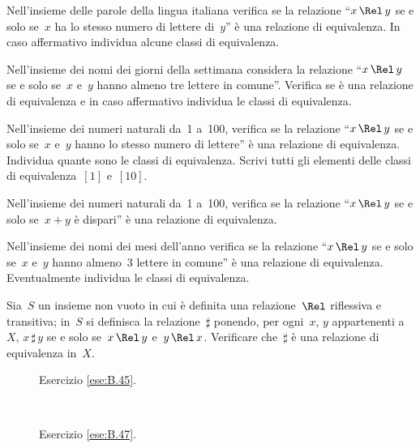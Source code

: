 \begin{multicols}{2}
\begin{esercizio}
\label{ese:B.38}
Nell'insieme delle parole della lingua italiana verifica se la relazione ``$x \,\Rel\, y$ se e solo se~$x$ ha lo stesso numero di lettere di~$y$'' è
una relazione di equivalenza. In caso affermativo individua alcune classi di
equivalenza.
\end{esercizio}

\begin{esercizio}
\label{ese:B.39}
Nell'insieme dei nomi dei giorni della settimana considera la relazione ``$x \,\Rel\, y$ se e solo se~$x$ e~$y$ hanno almeno tre lettere in comune''.
Verifica se è una relazione di equivalenza e in caso affermativo individua le
classi di equivalenza.
\end{esercizio}

\begin{esercizio}
\label{ese:B.40}
Nell'insieme dei numeri naturali da~1 a~100, verifica se la relazione ``$x \,\Rel\, y$ se e solo se~$x$ e~$y$ hanno lo stesso numero di lettere''
è una relazione di equivalenza. Individua quante sono le classi di equivalenza.
Scrivi tutti gli elementi delle classi di equivalenza~$[1]$ e~$[10]$.
\end{esercizio}

\begin{esercizio}
\label{ese:B.41}
Nell'insieme dei numeri naturali da~1 a~100, verifica se la relazione ``$x \,\Rel\, y$ se e solo se~$x+y$ è
dispari'' è una relazione di equivalenza.
\end{esercizio}

\begin{esercizio}
\label{ese:B.42}
Nell'insieme dei nomi dei mesi dell'anno verifica se la relazione ``$x \,\Rel\, y$ se e solo se~$x$ e~$y$ hanno almeno~3 lettere in comune''
è una relazione di equivalenza. Eventualmente individua le classi di equivalenza.
\end{esercizio}

\begin{esercizio}
\label{ese:B.43}
Sia~$S$ un insieme non vuoto in cui è definita una relazione~$\Rel$ riflessiva e transitiva; in~$S$ si definisca la relazione~$\sharp$ ponendo,
per ogni~$x$, $y$ appartenenti a~$X$, $x \,\sharp\, y$ se e solo se~$x \,\Rel\, y$ e~$y \,\Rel\, x$. Verificare che~$\sharp$ è una relazione di equivalenza in~$X$.
\end{esercizio}
\end{multicols}

\begin{figure}[t]
\begin{minipage}[b]{.45\textwidth}
 \centering
 
 \caption{Esercizio \ref{ese:B.45}.}\label{fig:B.20}
\end{minipage}\
\begin{minipage}[b]{.45\textwidth}
 \centering
 
 \caption{Esercizio \ref{ese:B.47}.}\label{fig:B.21}
\end{minipage}
\end{figure}

